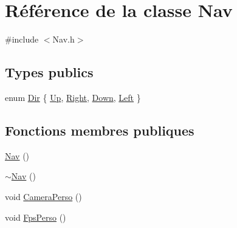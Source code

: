 \hypertarget{class_nav}{}\section{Référence de la classe Nav}
\label{class_nav}


{\ttfamily \#include $<$Nav.\+h$>$}

\subsection*{Types publics}
\begin{DoxyCompactItemize}
\item 
enum \hyperlink{class_nav_a08a9562b15243f3e42d98588db65090e}{Dir} \{ \hyperlink{class_nav_a08a9562b15243f3e42d98588db65090ea31f26a8a719a720338911f55bdc7795c}{Up}, 
\hyperlink{class_nav_a08a9562b15243f3e42d98588db65090ead8e466e526a3644f8729a93b8a353759}{Right}, 
\hyperlink{class_nav_a08a9562b15243f3e42d98588db65090ea2b91c812608ee39ea6dca48340e5b213}{Down}, 
\hyperlink{class_nav_a08a9562b15243f3e42d98588db65090eabb294d0e7ad76e4b48f5006a46ef15f5}{Left}
 \}
\end{DoxyCompactItemize}
\subsection*{Fonctions membres publiques}
\begin{DoxyCompactItemize}
\item 
\hyperlink{class_nav_a5e44bdaf95a13d5e265c17f3168182f8}{Nav} ()
\item 
\hyperlink{class_nav_a8a16a4104858c5c76ab490157d77bc29}{$\sim$\+Nav} ()
\item 
void \hyperlink{class_nav_a993a0ca0a3bedb5c5d8717edad632bfb}{Camera\+Perso} ()
\item 
void \hyperlink{class_nav_ac9460667c27ef1258d96ac8468cf61d8}{Fps\+Perso} ()
\end{DoxyCompactItemize}
